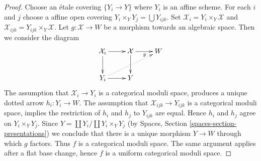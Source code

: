 \documentclass[10pt,a4paper]{amsart}
\theoremstyle{plain}
\theoremstyle{definition}
\theoremstyle{remark}
\numberwithin{equation}{subsection}
\begin{document}
\begin{proof}
Choose an \'etale covering $\{Y_i \to Y\}$ where $Y_i$ is an affine scheme.
For each $i$ and $j$ choose a affine open covering
$Y_i \times_Y Y_j = \bigcup Y_{ijk}$.
Set $\mathcal{X}_i = Y_i \times_Y \mathcal{X}$ and
$\mathcal{X}_{ijk} = Y_{ijk} \times_Y \mathcal{X}$.
Let $g : \mathcal{X} \to W$ be a morphism towards
an algebraic space. Then we consider the diagram
$$
\xymatrix{
\mathcal{X}_i \ar[r] \ar[d] & \mathcal{X} \ar[d] \ar[r]_g & W \\
Y_i \ar[r] \ar@{..>}[rru] & Y
}
$$
The assumption that $\mathcal{X}_i \to Y_i$ is a categorical moduli
space, produces a unique dotted arrow $h_i : Y_i \to W$.
The assumption that $\mathcal{X}_{ijk} \to Y_{ijk}$ is a categorical
moduli space, implies the restriction of $h_i$ and $h_j$ to
$Y_{ijk}$ are equal. Hence $h_i$ and $h_j$ agree on $Y_i \times_Y Y_j$.
Since $Y = \coprod Y_i / \coprod Y_i \times_Y Y_j$
(by Spaces, Section \ref{spaces-section-presentations}) we conclude
that there is a unique morphism $Y \to W$ through which $g$ factors.
Thus $f$ is a categorical moduli space. The same argument applies
after a flat base change, hence $f$ is a uniform categorical moduli space.
\end{proof}
\end{document}
